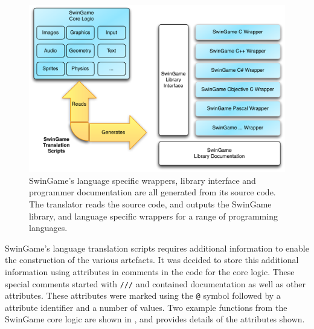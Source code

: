 \begin{figure}[thbp]
  \centering
  \includegraphics[width=\textwidth]{SwinGameTranslator}
  \caption{SwinGame's language specific wrappers, library interface and programmer documentation are all generated from its source code. The translator reads the source code, and outputs the SwinGame library, and language specific wrappers for a range of programming languages.}
  \label{fig:swingame_trans}
\end{figure}

SwinGame's language translation scripts requires additional information to enable the construction of the various artefacts. It was decided to store this additional information using attributes in comments in the code for the core logic. These special comments started with \texttt{///} and contained documentation as well as other attributes. These attributes were marked using the \texttt{@} symbol followed by a attribute identifier and a number of values. Two example functions from the SwinGame core logic are shown in , and  provides details of the attributes shown.


